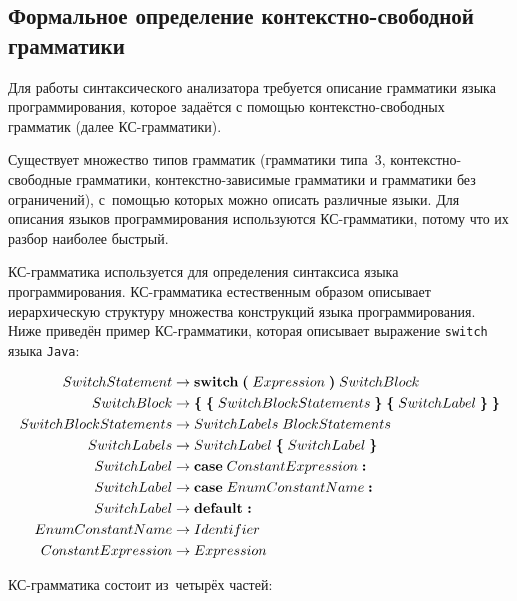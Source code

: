 \subsection{Формальное определение контекстно-свободной грамматики} \label{sub114}

Для работы синтаксического анализатора требуется описание грамматики языка программирования, которое задаётся с помощью контекстно-свободных грамматик (далее КС-грамматики).

Существует множество типов грамматик (грамматики типа~3, контекстно-свободные грамматики, контекстно-зависимые грамматики и грамматики без ограничений), с~помощью которых можно описать различные языки. Для описания языков программирования используются КС-грамматики, потому что их разбор наиболее быстрый.

КС-грамматика используется для определения синтаксиса языка программирования. КС-грамматика естественным образом описывает иерархическую структуру множества конструкций языка программирования. Ниже приведён пример КС-грамматики, которая описывает выражение \texttt{switch} языка \texttt{Java}:

\begin{align*}
SwitchStatement &\to \textbf{switch}\;\textbf{(}\; Expression\; \textbf{)}\; SwitchBlock \\
SwitchBlock &\to \textbf{\{}\; \textbf{\{}\;SwitchBlockStatements\;\textbf{\}}\; \textbf{\{}\;SwitchLabel\;\textbf{\}}\; \textbf{\}} \\
SwitchBlockStatements &\to SwitchLabels\; BlockStatements \\
SwitchLabels &\to SwitchLabel\; \textbf{\{}\;SwitchLabel\;\textbf{\}} \\
SwitchLabel &\to \textbf{case}\; ConstantExpression\; \textbf{:} \\
SwitchLabel &\to \textbf{case}\; EnumConstantName \;\textbf{:} \\
SwitchLabel &\to \textbf{default\;:} \\
EnumConstantName &\to Identifier \\
ConstantExpression &\to Expression
\end{align*}

КС-грамматика состоит из~четырёх частей:
 
